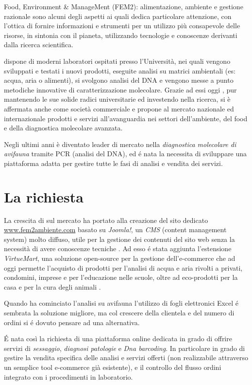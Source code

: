 Food, Environment \& ManageMent (FEM2): alimentazione, ambiente e gestione razionale sono alcuni degli aspetti ai quali {\fem} dedica particolare attenzione, con l'ottica di fornire informazioni e strumenti per un utilizzo più consapevole delle risorse, in sintonia con il pianeta, utilizzando tecnologie e conoscenze derivanti dalla ricerca scientifica.

{\fem} dispone di moderni laboratori ospitati presso l’Università, nei quali vengono sviluppati e testati i nuovi prodotti, eseguite analisi su matrici ambientali (es: acqua, aria o alimenti), si svolgono analisi del DNA e vengono messe a punto metodiche innovative di caratterizzazione molecolare. Grazie ad essi oggi {\fem}, pur mantenendo le sue solide radici universitarie ed investendo nella ricerca, si è affermata anche come società commerciale e propone al mercato nazionale ed internazionale prodotti e servizi all'avanguardia nei settori dell'ambiente, del food e della diagnostica molecolare avanzata.

Negli ultimi anni è diventato leader di mercato nella \emph{diagnostica molecolare di avifauna} tramite PCR (analisi del DNA), ed é nata la necessita di sviluppare una piattaforma adatta per gestire tutte le fasi di analisi e vendita dei servizi.

\section{La richiesta}
\label{sec:richiesta}

La crescita di {\fem} sul mercato ha portato alla creazione del sito dedicato \url{www.fem2ambiente.com} basato su \emph{Joomla!}, un \emph{CMS} (content management system) molto diffuso, utile per la gestione dei contenuti del sito web senza la necessità di avere conoscenze tecniche \cite{joomla}. Ad esso é stata aggiunta l'estensione \emph{VirtueMart}, una soluzione open-source per la gestione dell'e-commerce che ad oggi permette l'acquisto di prodotti per l'analisi di acqua e aria rivolti a privati, condomini, imprese e per l'educazione nelle scuole, oltre ad eco-prodotti per la casa e per la cura degli animali \cite{virtuemart}.

Quando {\fem} ha cominciato l'analisi su avifauna l'utilizzo di fogli elettronici Excel é sembrata la soluzione migliore, ma col crescere della clientela e del numero di ordini si é dovuto pensare ad una alternativa. 

É nata così la richiesta di una piattaforma online dedicata in grado di offrire servizi di \emph{sessaggio}, \emph{diagnosi patologie} e \emph{Dna barcoding}. In particolare in grado di gestire la vendita specifica delle analisi e servizi offerti (non realizzabile attraverso un semplice tool e-commerce già esistente), e il controllo del flusso ordini integrato con i procedimenti in laboratorio.

